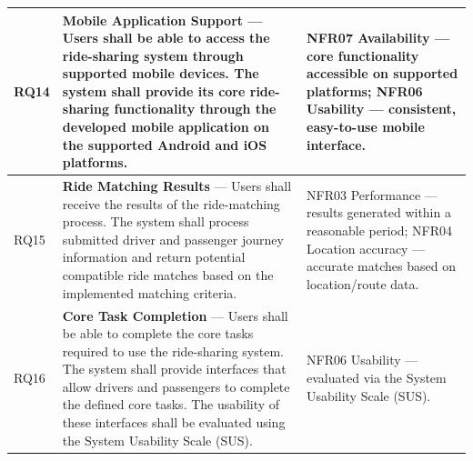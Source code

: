 \begin{longtable}{|>{\raggedright\arraybackslash}p{}
                   |>{\raggedright\arraybackslash}p{}
                   |>{\raggedright\arraybackslash}p{}|}
RQ14 & \textbf{Mobile Application Support} --- Users shall be able to access the ride-sharing system through supported mobile devices. The system shall provide its core ride-sharing functionality through the developed mobile application on the supported Android and iOS platforms. & NFR07 Availability --- core functionality accessible on supported platforms; \newline NFR06 Usability --- consistent, easy-to-use mobile interface. \\
\hline

RQ15 & \textbf{Ride Matching Results} --- Users shall receive the results of the ride-matching process. The system shall process submitted driver and passenger journey information and return potential compatible ride matches based on the implemented matching criteria. & NFR03 Performance --- results generated within a reasonable period; \newline NFR04 Location accuracy --- accurate matches based on location/route data. \\
\hline

RQ16 & \textbf{Core Task Completion} --- Users shall be able to complete the core tasks required to use the ride-sharing system. The system shall provide interfaces that allow drivers and passengers to complete the defined core tasks. The usability of these interfaces shall be evaluated using the System Usability Scale (SUS). & NFR06 Usability --- evaluated via the System Usability Scale (SUS). \\
\hline

\end{longtable}
